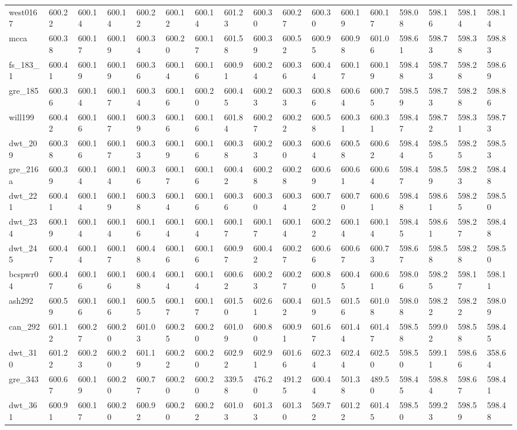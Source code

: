 \begin{tabular}{lllllllllllllllll}
west0167 & 600.22 & 600.14 & 600.14 & 600.22 & 600.12 & 600.14 & 601.23 & 600.30 & 600.27 & 600.30 & 600.19 & 600.17 & 598.08 & 598.16 & 598.14 & 598.14 \\
mcca & 600.38 & 600.17 & 600.19 & 600.34 & 600.20 & 600.17 & 601.58 & 600.39 & 600.52 & 600.95 & 600.98 & 601.06 & 598.61 & 598.73 & 598.38 & 598.83 \\
fs\_183\_1 & 600.41 & 600.19 & 600.19 & 600.36 & 600.14 & 600.16 & 600.91 & 600.24 & 600.36 & 600.44 & 600.17 & 600.19 & 598.48 & 598.73 & 598.28 & 598.69 \\
gre\_185 & 600.36 & 600.14 & 600.17 & 600.34 & 600.16 & 600.20 & 600.45 & 600.23 & 600.33 & 600.86 & 600.64 & 600.75 & 598.59 & 598.73 & 598.28 & 598.86 \\
will199 & 600.42 & 600.16 & 600.17 & 600.39 & 600.16 & 600.16 & 601.84 & 600.27 & 600.22 & 600.58 & 600.31 & 600.31 & 598.47 & 598.72 & 598.31 & 598.73 \\
dwt\_209 & 600.38 & 600.16 & 600.17 & 600.33 & 600.19 & 600.16 & 600.38 & 600.23 & 600.30 & 600.64 & 600.58 & 600.62 & 598.44 & 598.55 & 598.25 & 598.53 \\
gre\_216a & 600.39 & 600.14 & 600.14 & 600.36 & 600.17 & 600.16 & 600.42 & 600.28 & 600.28 & 600.69 & 600.61 & 600.64 & 598.47 & 598.59 & 598.23 & 598.48 \\
dwt\_221 & 600.41 & 600.14 & 600.19 & 600.38 & 600.14 & 600.16 & 600.36 & 600.30 & 600.34 & 600.72 & 600.70 & 600.61 & 598.48 & 598.61 & 598.25 & 598.50 \\
dwt\_234 & 600.19 & 600.14 & 600.14 & 600.16 & 600.14 & 600.14 & 600.17 & 600.17 & 600.14 & 600.22 & 600.14 & 600.14 & 598.45 & 598.61 & 598.27 & 598.48 \\
dwt\_245 & 600.47 & 600.14 & 600.17 & 600.48 & 600.16 & 600.16 & 600.97 & 600.42 & 600.27 & 600.66 & 600.67 & 600.73 & 598.67 & 598.58 & 598.28 & 598.50 \\
bcspwr04 & 600.47 & 600.16 & 600.16 & 600.48 & 600.14 & 600.14 & 600.62 & 600.23 & 600.27 & 600.80 & 600.45 & 600.61 & 598.06 & 598.25 & 598.17 & 598.11 \\
ash292 & 600.59 & 600.16 & 600.16 & 600.55 & 600.17 & 600.17 & 601.50 & 602.61 & 600.42 & 601.59 & 601.56 & 601.08 & 598.08 & 598.22 & 598.22 & 598.09 \\
can\_292 & 601.12 & 600.27 & 600.20 & 601.03 & 600.25 & 600.20 & 601.09 & 600.80 & 600.91 & 601.67 & 601.44 & 601.47 & 598.58 & 599.02 & 598.58 & 598.45 \\
dwt\_310 & 601.22 & 600.23 & 600.20 & 601.19 & 600.22 & 600.20 & 602.92 & 602.91 & 601.66 & 602.34 & 602.44 & 602.50 & 598.50 & 599.11 & 598.66 & 358.64 \\
gre\_343 & 600.67 & 600.19 & 600.20 & 600.77 & 600.20 & 600.20 & 339.58 & 476.20 & 491.25 & 600.44 & 501.38 & 489.50 & 598.45 & 598.84 & 598.67 & 598.41 \\
dwt\_361 & 600.91 & 600.17 & 600.20 & 600.92 & 600.20 & 600.22 & 601.03 & 601.33 & 601.30 & 569.72 & 601.22 & 601.45 & 598.50 & 599.23 & 598.59 & 598.48 \\
\hline
\end{tabular}
